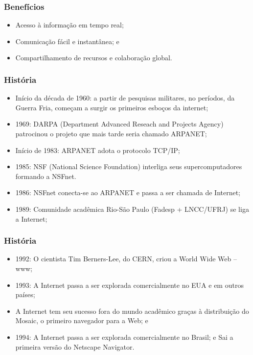 \documentclass[aspectratio=169]{beamer} %
\begin{document}
\begin{frame}
	\frametitle{Benefícios}
	
	\begin{itemize}
		\item Acesso à informação em tempo real;
		\item Comunicação fácil e instantânea; e
		\item Compartilhamento de recursos e colaboração global.
	\end{itemize}
\end{frame}

\begin{frame}
	\frametitle{História}
	
	\begin{itemize}
		\item Início da década de 1960: a partir de pesquisas militares, no períodos, da Guerra Fria, começam a surgir os primeiros esboços da internet;
		\item 1969: DARPA (Department Advanced Reseach and Projects Agency) patrocinou o projeto que mais tarde seria chamado ARPANET;
		\item Início de 1983: ARPANET adota o protocolo TCP/IP;
		\item 1985: NSF (National Science Foundation) interliga seus supercomputadores formando a NSFnet.
		\item 1986: NSFnet conecta-se ao ARPANET e passa a ser chamada de Internet;
		\item 1989: Comunidade acadêmica Rio-São Paulo (Fadesp + LNCC/UFRJ) se liga a Internet;
	\end{itemize}
\end{frame}

\begin{frame}
	\frametitle{História}
	
	\begin{itemize}
		\item 1992: O cientista Tim Berners-Lee, do CERN, criou a World Wide Web – www;
		\item 1993: A Internet passa a ser explorada comercialmente no EUA e em outros países;
		\item A Internet tem seu sucesso fora do mundo acadêmico graças à distribuição do Mosaic, o primeiro navegador para a Web; e
		\item 1994: A Internet passa a ser explorada comercialmente no Brasil; e Sai a primeira versão do Netscape Navigator.
	\end{itemize}
\end{frame}
\end{document}
